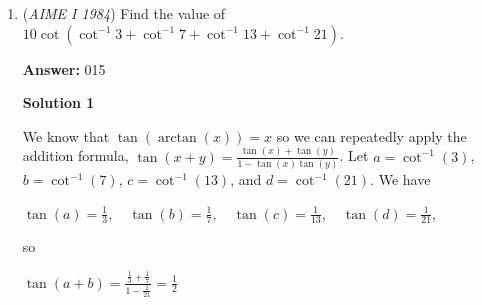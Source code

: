 \begin{enumerate}
 Solution by \href{https://artofproblemsolving.com/wiki/index.php?title=User:A1b2}{a1b2}

 



\textbf{Solution 3}

Since this is a recursive problem, list out the functions $f(2)$ and $f(7)$ and figure out what they would be equivalent to. Then find the $x$ values for the functions that are equal to $f(2)$ and $f(7)$. You will notice that it starts at $x=0$, then it goes to $x=5$, $x=10$, etc... each $f(x)$ has two possible $x$ values. However, we are only counting the total number of $x$ values, so ignore the double counted values. This means that $x = 0, \pm 5, \pm 10, \pm 15... \pm 1000$ so the answer is $400 + 1$ = $\boxed{401}$




\textbf{Solution 4}

Let $z$ be an arbitrary zero. If $z=2-x$, then $x=2-z$ and $2+x=4-z$. Repeat with other equation to find if $z$ is a zero then so are $4-z$ and $14-z$. From $0$, we get $4$ and $14$. Now note that applying either of these twice will return $z$, so we must apply them in an alternating fashion for distinct roots. Doing so to $4$ and $14$ returns $10$ and $-10$, respectively. A pattern will emerge of each path hitting a multiple of $10$ after $2$ moves. Hence, we will reach $\pm 1000$ after $200$ jumps in either direction. Including zero, there are $2\cdot200+1=\boxed{401}$



	\item (\textit{AIME I 1984}) Find the value of $10\cot(\cot^{-1}3+\cot^{-1}7+\cot^{-1}13+\cot^{-1}21).$

 \textbf{Answer: }015



\textbf{Solution 1}

We know that $\tan(\arctan(x)) = x$ so we can repeatedly apply the addition formula, $\tan(x+y) = \frac{\tan(x)+\tan(y)}{1-\tan(x)\tan(y)}$. Let $a = \cot^{-1}(3)$, $b=\cot^{-1}(7)$, $c=\cot^{-1}(13)$, and $d=\cot^{-1}(21)$. We have

 $\tan(a)=\frac{1}{3},\quad\tan(b)=\frac{1}{7},\quad\tan(c)=\frac{1}{13},\quad\tan(d)=\frac{1}{21}$,

 

 so

 $\tan(a+b) = \frac{\frac{1}{3}+\frac{1}{7}}{1-\frac{1}{21}} = \frac{1}{2}$

 


\end{enumerate}
